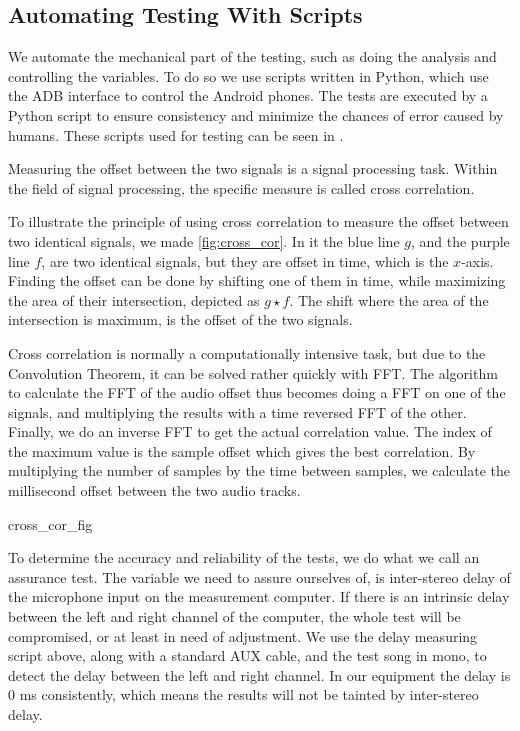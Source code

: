 \subsection{Automating Testing With Scripts}
We automate the mechanical part of the testing, such as doing the
analysis and controlling the variables. To do so we use scripts written
in Python, which use the \ac{ADB} interface to control the Android
phones. The tests are executed by a Python script to ensure
consistency and minimize the chances of error caused by humans.
These scripts used for testing can be seen in .

Measuring the offset between the two signals is a signal processing
task. Within the field of signal processing, the specific measure is
called cross correlation.

To illustrate the principle of using cross correlation to measure the offset between two identical signals, we made \cref{fig:cross_cor}.
In it the blue line $g$, and the purple line $f$, are two identical signals, but they are offset in time, which is the $x$-axis.
Finding the offset can be done by shifting one of them in time, while maximizing the area of their intersection, depicted as $g \star f$.
The shift where the area of the intersection is maximum, is the offset of the two signals.

Cross correlation is normally
a computationally intensive task, but due to the Convolution
Theorem\cite{conv_theo}, it can be solved rather quickly with \ac{FFT}.
The algorithm to calculate the \ac{FFT} of the audio offset thus becomes
doing a \ac{FFT} on one of the signals, and multiplying the results with
a time reversed \ac{FFT} of the other. Finally, we do an inverse \ac{FFT}
to get the actual correlation value. The index of the maximum value is
the sample offset which gives the best correlation.
By multiplying the
number of samples by the time between samples, we calculate the
millisecond offset between the two audio tracks.




{cross_cor_fig}

To determine the accuracy and reliability of the tests, we do what we
call an assurance test. The variable we need to assure
ourselves of, is inter-stereo delay of the microphone input on the
measurement computer. If there is an intrinsic delay between the left and
right channel of the computer, the whole test will be
compromised, or at least in need of adjustment. We use the delay
measuring script above, along with a standard AUX cable,
and the test song in mono, to detect the delay
between the left and right channel. In our equipment the delay is 0 ms
consistently, which means the results will not be tainted by inter-stereo
delay.


